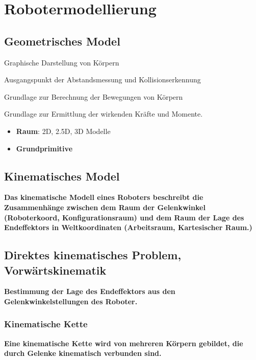 \chapter{Robotermodellierung}
\section{Geometrisches Model}
\begin{compactitem}
    \item Graphische Darstellung von Körpern
    \item Ausgangspunkt der Abstandsmessung und Kollisionserkennung
    \item Grundlage zur Berechnung der Bewegungen von Körpern
    \item Grundlage zur Ermittlung der wirkenden Kräfte und Momente.
\end{compactitem}

\begin{itemize}
    \item \textbf{Raum}: 2D, 2.5D, 3D Modelle
    \item \textbf{Grundprimitive}
\end{itemize}
\section{Kinematisches Model}
\textbf{Das kinematische Modell eines Roboters beschreibt die Zusammenhänge zwischen
dem Raum der Gelenkwinkel (Roboterkoord, Konfigurationsraum) und dem Raum der
Lage des Endeffektors in Weltkoordinaten (Arbeitsraum, Kartesischer Raum.)}
\section{Direktes kinematisches Problem, Vorwärtskinematik}
\textbf{Bestimmung der Lage des Endeffektors aus den Gelenkwinkelstellungen des Roboter.}

\subsection{Kinematische Kette}
\textbf{Eine kinematische Kette wird von mehreren Körpern gebildet, die durch Gelenke kinematisch
verbunden sind.}

